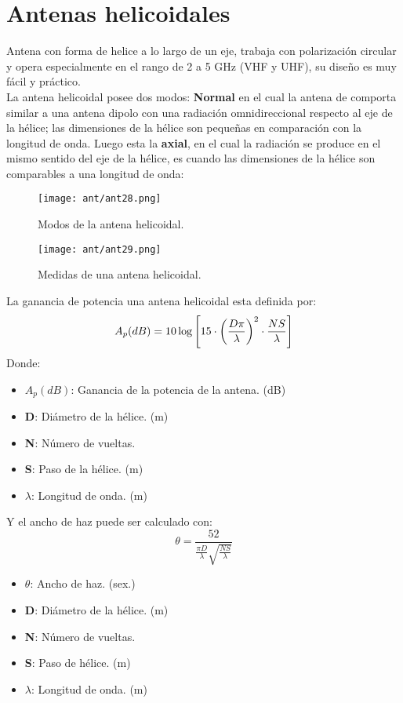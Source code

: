 \documentclass[
	12pt, %
	fleqn, %
	a4paper, %
	oneside, %
]{LegrandOrangeBook}
\begin{document}
\section{Antenas helicoidales}
Antena con forma de helice a lo largo de un eje, trabaja con polarización circular y opera especialmente en el rango de 2 a 5 GHz (VHF y UHF), su diseño es muy fácil y práctico.\\
La antena helicoidal posee dos modos: \textbf{Normal} en el cual la antena de comporta similar a una antena dipolo con una radiación omnidireccional respecto al eje de la hélice; las dimensiones de la hélice son pequeñas en comparación con la longitud de onda. Luego esta la \textbf{axial}, en el cual la radiación se produce en el mismo sentido del eje de la hélice, es cuando las dimensiones de la hélice son comparables a una longitud de onda:
\begin{figure}[H]
\centering
\texttt{[image: ant/ant28.png]}
\caption{Modos de la antena helicoidal.}
\end{figure}
\begin{figure}[H]
\centering
\texttt{[image: ant/ant29.png]}
\caption{Medidas de una antena helicoidal.}
\end{figure}
La ganancia de potencia una antena helicoidal esta definida por:
\begin{equation}
A_p(dB)=10\log\left[15\cdot \left(\frac{D\pi}{\lambda}\right)^2\cdot\frac{NS}{\lambda}\right]
\end{equation}
Donde:
\begin{itemize}
\item $A_p(dB)$: Ganancia de la potencia de la antena. (dB)
\item \textbf{D}: Diámetro de la hélice. (m)
\item \textbf{N}: Número de vueltas.
\item \textbf{S}: Paso de la hélice. (m)
\item $\lambda$: Longitud de onda. (m)
\end{itemize}
Y el ancho de haz puede ser calculado con:
\begin{equation}
\theta=\frac{52}{\frac{\pi D}{\lambda}\sqrt{\frac{NS}{\lambda}}}
\end{equation}
\begin{itemize}
\item $\theta$: Ancho de haz. (sex.)
\item \textbf{D}: Diámetro de la hélice. (m)
\item \textbf{N}: Número de vueltas.
\item \textbf{S}: Paso de hélice. (m)
\item $\lambda$: Longitud de onda. (m)
\end{itemize}
\end{document}
